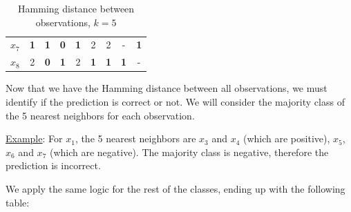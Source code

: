 \documentclass[12pt]{article}
\begin{document}
\begin{enumerate}[leftmargin=\labelsep]
\begin{table}[H]
\begin{center}
\begin{tabular}{c|cccccccc}
                $x_7$ & \textbf{\textcolor{codegreen}{1}} & \textbf{\textcolor{codegreen}{1}} & \textbf{\textcolor{codegreen}{0}} & \textbf{\textcolor{codegreen}{1}} & 2 & 2 & \-- & \textbf{\textcolor{codepink}{1}} \\ 
                $x_8$ & 2 & \textbf{\textcolor{codegreen}{0}} & \textbf{\textcolor{codegreen}{1}} & 2 & \textbf{\textcolor{codepink}{1}} & \textbf{\textcolor{codepink}{1}} & \textbf{\textcolor{codepink}{1}} & \-- \\ 
            \end{tabular}
            \caption{Hamming distance between observations, $k=5$}
        \end{center}
    \end{table}

    Now that we have the Hamming distance between all observations, we must identify if the prediction is correct or not. We will consider the majority class of the 5 nearest neighbors for each observation.
    
    \vspace{10pt}
    \underline{Example}: For $x_1$, the 5 nearest neighbors are $x_3$ and $x_4$ (which are positive), $x_5$, $x_6$ and $x_7$ (which are negative). The majority class is negative, therefore the prediction is incorrect.
    
    \newpage
    We apply the same logic for the rest of the classes, ending up with the following table:


\end{enumerate}
\end{document}
